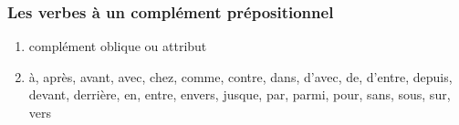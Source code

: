 \documentclass[UTF8]{report}
\begin{document}
\subsubsection{Les verbes à un complément prépositionnel}
\begin{enumerate}
    \item complément oblique ou attribut 
    \item à, après, avant, avec, chez, comme, contre, dans, d’avec, de, d’entre, depuis, devant, derrière, en, entre, envers, jusque, par, parmi, pour, sans, sous, sur, vers
\end{enumerate}


\begin{table}[H]
    \centering
    \small %
    \renewcommand{\arraystretch}{1.0} %


\end{table}
\end{document}
